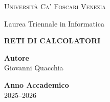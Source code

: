 \thispagestyle{empty}


\begin{center}

    {\Large \textsc{Università Ca' Foscari Venezia}\par}
    \vspace{0.5cm}
    {\large Laurea Triennale in Informatica\par}


    {\color{title}\Huge\sffamily\bfseries RETI DI CALCOLATORI\par}


    {\large
        \textbf{Autore}\\
        Giovanni Quacchia\par
        \vspace{1cm}
        \textbf{Anno Accademico}\\
        2025--2026
    }


\end{center}

\clearpage